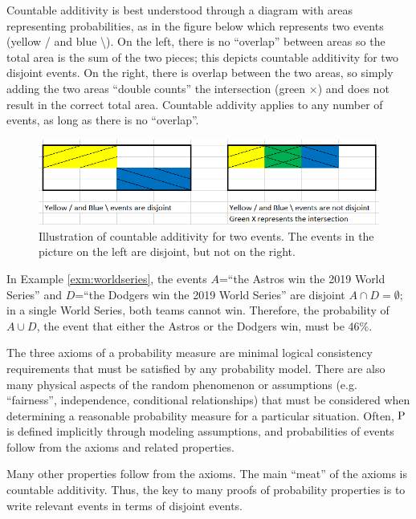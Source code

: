 \documentclass[
]{book}
\theoremstyle{definition}
\theoremstyle{definition}
\theoremstyle{definition}
\theoremstyle{remark}
\begin{document}
Countable additivity is best understood through a diagram with areas representing probabilities, as in the figure below which represents two events (yellow / and blue \textbackslash). On the left, there is no ``overlap'' between areas so the total area is the sum of the two pieces; this depicts countable additivity for two disjoint events. On the right, there is overlap between the two areas, so simply adding the two areas ``double counts'' the intersection (green \(\times\)) and does not result in the correct total area. Countable addivity applies to any number of events, as long as there is no ``overlap''.



\begin{figure}
\includegraphics[width=10.24in]{_graphics/venn-disjoint} \caption{Illustration of countable additivity for two events. The events in the picture on the left are disjoint, but not on the right.}\label{fig:venn-disjoint}
\end{figure}

In Example \ref{exm:worldseries}, the events \(A\)=``the Astros win the 2019 World Series'' and \(D\)=``the Dodgers win the 2019 World Series'' are disjoint \(A\cap D = \emptyset\); in a single World Series, both teams cannot win. Therefore, the probability of \(A\cup D\), the event that either the Astros or the Dodgers win, must be 46\%.

The three axioms of a probability measure are minimal logical consistency requirements that must be satisfied by any probability model. There are also many physical aspects of the random phenomenon or assumptions (e.g.
``fairness'', independence, conditional relationships) that must be considered when determining a reasonable
probability measure for a particular situation. Often, \(\textrm{P}\) is defined implicitly through modeling
assumptions, and probabilities of events follow from the
axioms and related properties.

Many other properties follow from the axioms. The main ``meat'' of the axioms is countable additivity. Thus, the key to many proofs of probability properties is to write relevant events in terms of disjoint events.
\end{document}
